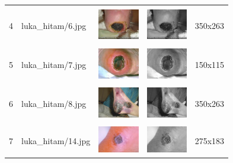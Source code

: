 \begin{table}[H]
\begin{tabular}{|m{0.2in}|m{1.2in}|m{0.7in}|m{0.7in}|m{0.7in}|}
		& &  &  &\\
		4& 
		luka\_hitam/6.jpg &
		\includegraphics[width=0.7in]{dataset/dataset_3/luka_hitam/ready/6.jpg}&
		\includegraphics[width=0.7in]{dataset/dataset_3/luka_hitam/ready/6_gray.jpg}&
		350x263\\
		\hline
		
		& &  &  &\\
		5& 
		luka\_hitam/7.jpg &
		\includegraphics[width=0.7in]{dataset/dataset_3/luka_hitam/ready/7.jpg}&
		\includegraphics[width=0.7in]{dataset/dataset_3/luka_hitam/ready/7_gray.jpg}&
		150x115\\
		\hline
		
		& &  &  &\\
		6& 
		luka\_hitam/8.jpg &
		\includegraphics[width=0.7in]{dataset/dataset_3/luka_hitam/ready/8.jpg}&
		\includegraphics[width=0.7in]{dataset/dataset_3/luka_hitam/ready/8_gray.jpg}&
		350x263\\
		\hline
		
		& &  &  &\\
		7& 
		luka\_hitam/14.jpg &
		\includegraphics[width=0.7in]{dataset/dataset_3/luka_hitam/ready/14.jpg}&
		\includegraphics[width=0.7in]{dataset/dataset_3/luka_hitam/ready/14_gray.jpg}&
		275x183\\
		\hline
	\end{tabular}
\end{table}

